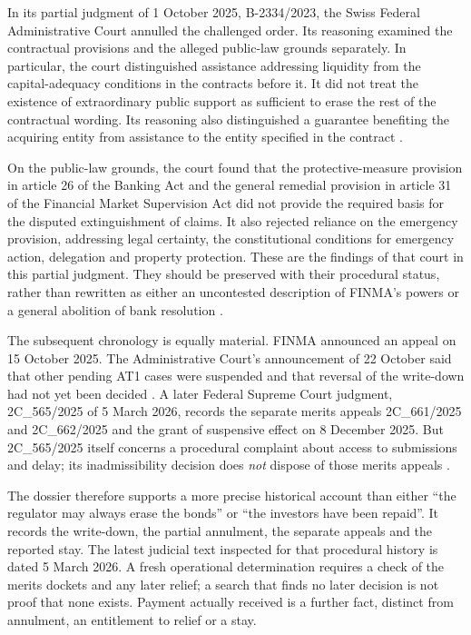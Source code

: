 \documentclass[12pt,a4paper,oneside,openany]{book}
\begin{document}
In its partial judgment of 1 October 2025, B-2334/2023, the Swiss Federal
Administrative Court annulled the challenged order. Its reasoning examined the
contractual provisions and the alleged public-law grounds separately. In
particular, the court distinguished assistance addressing liquidity from the
capital-adequacy conditions in the contracts before it. It did not treat the
existence of extraordinary public support as sufficient to erase the rest of
the contractual wording. Its reasoning also distinguished a guarantee benefiting
the acquiring entity from assistance to the entity specified in the contract
\citep[reasons~5.3--5.5, especially 5.4.4--5.4.8]{csat1judgment2025}.

On the public-law grounds, the court found that the protective-measure provision
in article 26 of the Banking Act and the general remedial provision in article
31 of the Financial Market Supervision Act did not provide the required basis
for the disputed extinguishment of claims. It also rejected reliance on the
emergency provision, addressing legal certainty, the constitutional conditions
for emergency action, delegation and property protection. These are the
findings of that court in this partial judgment. They should be preserved with
their procedural status, rather than rewritten as either an uncontested
description of FINMA's powers or a general abolition of bank resolution
\citep[reasons~6.8--6.10, 7.6--7.11, 8 and 10]{csat1judgment2025}.

The subsequent chronology is equally material. FINMA announced an appeal on
15 October 2025. The Administrative Court's announcement of 22 October said
that other pending AT1 cases were suspended and that reversal of the write-down
had not yet been decided \citep{csat1appeal2025,csat1suspension2025}.
A later Federal Supreme Court judgment,
2C\_565/2025 of 5 March 2026, records the separate merits appeals
2C\_661/2025 and 2C\_662/2025 and the grant of suspensive effect on
8 December 2025. But 2C\_565/2025 itself concerns a procedural complaint
about access to submissions and delay; its inadmissibility decision does
\emph{not} dispose of those merits appeals
\citep[facts~D, reasons~1.1--1.4 and operative order]{csat1procedure2026}.

The dossier therefore supports a more precise historical account than either
``the regulator may always erase the bonds'' or ``the investors have been
repaid''. It records the write-down, the partial annulment, the separate appeals
and the reported stay. The latest judicial text inspected for that procedural
history is dated 5 March 2026. A fresh operational determination requires a
check of the merits dockets and any later relief; a search that finds no later
decision is not proof that none exists. Payment actually received is a further
fact, distinct from annulment, an entitlement to relief or a stay.
\end{document}
